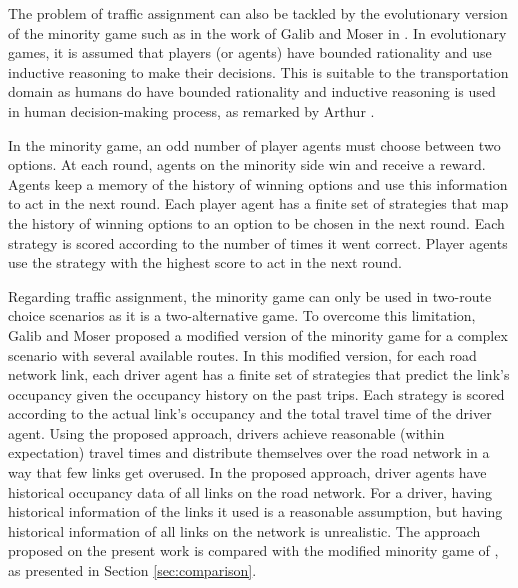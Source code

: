 \documentclass{RITA}
\begin{document}
The problem of traffic assignment can also be tackled by the evolutionary version of the minority game \cite{Challet&Zhang1997} such as in the work of Galib and Moser in \cite{Galib&Moser2011}. In evolutionary games, it is assumed that players (or agents) have bounded rationality and use inductive reasoning to make their decisions. This is suitable to the transportation domain as humans do have bounded rationality and inductive reasoning is used in human decision-making process, as remarked by Arthur \cite{Arthur1994}.

In the minority game, an odd number of player agents must choose between two options. At each round, agents on the minority side win and receive a reward. Agents keep a memory of the history of winning options and use this information to act in the next round. Each player agent has a finite set of strategies that map the history of winning options to an option to be chosen in the next round. Each strategy is scored according to the number of times it went correct. Player agents use the strategy with the highest score to act in the next round.

Regarding traffic assignment, the minority game can only be used in two-route choice scenarios as it is a two-alternative game. To overcome this limitation, Galib and Moser \cite{Galib&Moser2011} proposed a modified version of the minority game for a complex scenario with several available routes. In this modified version, for each road network link, each driver agent has a finite set of strategies that predict the link's occupancy given the occupancy history on the past trips. Each strategy is scored according to the actual link's occupancy and the total travel time of the driver agent. Using the proposed approach, drivers achieve reasonable (within expectation) travel times and distribute themselves over the road network in a way that few links get overused. In the proposed approach, driver agents have historical occupancy data of all links on the road network. For a driver, having historical information of the links it used is a reasonable assumption, but having historical information of all links on the network is unrealistic. The approach proposed on the present work is compared with the modified minority game of \cite{Galib&Moser2011}, as presented in Section \ref{sec:comparison}. 

\end{document}

